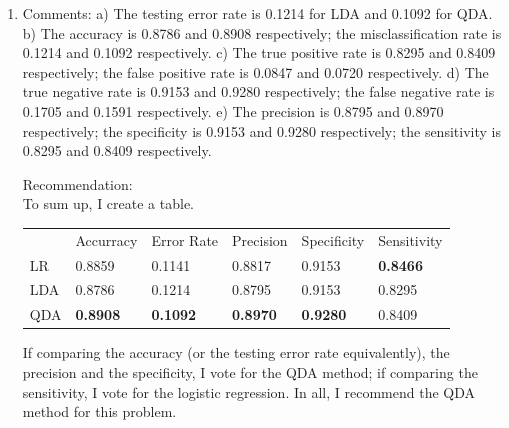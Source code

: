 \documentclass[10pt]{article}
\begin{document}
\begin{enumerate}[1)]
\item
Comments:
\subitem
a) The testing error rate is 0.1214 for LDA and 0.1092 for QDA.
\subitem
b) The accuracy is 0.8786 and 0.8908 respectively; the misclassification rate is 0.1214 and 0.1092 respectively.
\subitem
c) The true positive rate is 0.8295 and 0.8409 respectively; the false positive rate is 0.0847 and 0.0720 respectively.
\subitem
d) The true negative rate is 0.9153 and 0.9280 respectively; the false negative rate is 0.1705 and 0.1591 respectively.
\subitem
e) The precision is 0.8795 and 0.8970 respectively; the specificity is 0.9153 and 0.9280 respectively; the sensitivity is 0.8295 and 0.8409 respectively.
\vspace{3mm}

Recommendation:\\
To sum up, I create a table.\\
\begin{tabular}{llllll}
                    & Accurracy       & Error Rate      & Precision       & Specificity     & Sensitivity     \\
LR                  & 0.8859          & 0.1141          & 0.8817          & 0.9153          & \textbf{0.8466} \\
LDA                 & 0.8786          & 0.1214          & 0.8795          & 0.9153          & 0.8295          \\
QDA                 & \textbf{0.8908} & \textbf{0.1092} & \textbf{0.8970} & \textbf{0.9280} & 0.8409
\end{tabular}
\vspace{3mm}

If comparing the accuracy (or the testing error rate equivalently), the precision and the specificity, I vote for the QDA method; if comparing the sensitivity, I vote for the logistic regression. In all, I recommend the QDA method for this problem. %

\end{enumerate}
\vspace{3mm}
\end{document}
